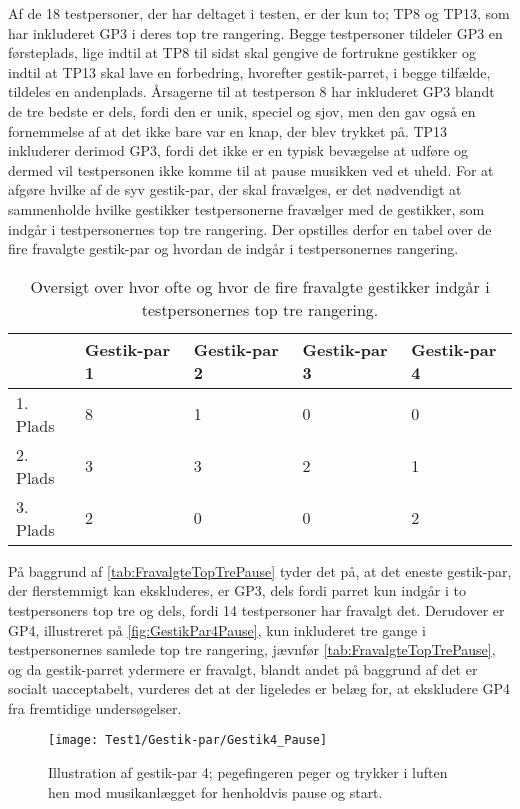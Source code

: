 Af de 18 testpersoner, der har deltaget i testen, er der kun to; TP8 og TP13, som har inkluderet GP3 i deres top tre rangering. Begge testpersoner tildeler GP3 en førsteplads, lige indtil at TP8 til sidst skal gengive de fortrukne gestikker og indtil at TP13 skal lave en forbedring, hvorefter gestik-parret, i begge tilfælde, tildeles en andenplads. Årsagerne til at testperson 8 har inkluderet GP3 blandt de tre bedste er dels, fordi den er unik, speciel og sjov, men den gav også en fornemmelse af at det ikke bare var en knap, der blev trykket på. TP13 inkluderer derimod GP3, fordi det ikke er en typisk bevægelse at udføre og dermed vil testpersonen ikke komme til at pause musikken ved et uheld.\blankline
%
For at afgøre hvilke af de syv gestik-par, der skal fravælges, er det nødvendigt at sammenholde hvilke gestikker testpersonerne fravælger med de gestikker, som indgår i testpersonernes top tre rangering. Der opstilles derfor en tabel over de fire fravalgte gestik-par og hvordan de indgår i testpersonernes rangering.
%
\begin{table}[H]
	\centering
	\begin{tabular}{ | p{2.4cm} | p{2.4cm} | p{2.4cm} | p{2.4cm} | p{2.4cm} |}
	\hline
		 & Gestik-par 1 & Gestik-par 2 & Gestik-par 3 & Gestik-par 4 \\ \hline
		1. Plads & 8 & 1 & 0 & 0\\ \hline
		2. Plads & 3 & 3 & 2 & 1\\ \hline
		3. Plads & 2 & 0 & 0 & 2\\ \hline
	\end{tabular}
	\caption{Oversigt over hvor ofte og hvor de fire fravalgte gestikker indgår i testpersonernes top tre rangering.}
	\label{tab:FravalgteTopTrePause}
\end{table}
\noindent
%
På baggrund af \autoref{tab:FravalgteTopTrePause} tyder det på, at det eneste gestik-par, der flerstemmigt kan ekskluderes, er GP3, dels fordi parret kun indgår i to testpersoners top tre og dels, fordi 14 testpersoner har fravalgt det. Derudover er GP4, illustreret på \autoref{fig:GestikPar4Pause}, kun inkluderet tre gange i testpersonernes samlede top tre rangering, jævnfør \autoref{tab:FravalgteTopTrePause}, og da gestik-parret ydermere er fravalgt, blandt andet på baggrund af det er socialt uacceptabelt, vurderes det at der ligeledes er belæg for, at ekskludere GP4 fra fremtidige undersøgelser.  
%
\begin{figure}[H]
	\centering
	\texttt{[image: Test1/Gestik-par/Gestik4\_Pause]}
	\caption{Illustration af gestik-par 4; pegefingeren peger og trykker i luften hen mod musikanlægget for henholdvis pause og start.}
	\label{fig:GestikPar4Pause}
\end{figure}
